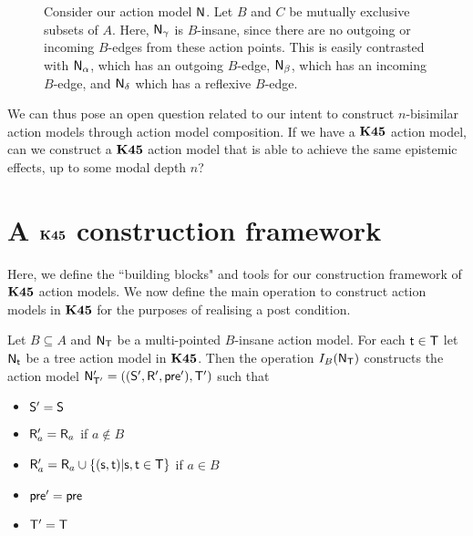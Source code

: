 \begin{figure}
\centering
{}
\caption[$B$-insane action models]{Consider our action model $\mathrm{\mathsf{N}}$. Let $B$ and $C$ be mutually exclusive
  subsets of $A$. Here, $\mathrm{\mathsf{N}}_\gamma$
  is $B$-insane, since there are no outgoing or incoming $B$-edges from these
  action points.
This is easily contrasted with $\mathrm{\mathsf{N}}_\alpha$, which has an outgoing $B$-edge, $\mathrm{\mathsf{N}}_\beta$, which
has an incoming $B$-edge, and $\mathrm{\mathsf{N}}_\delta$ which has a reflexive $B$-edge.}
\label{bInsaneExample}
\end{figure}

We can thus pose an open question related to our intent to construct $n$-bisimilar action models
through action model composition.
If we have a $\bf K45$ action model, can we construct a $\bf K45$ action model that is able to achieve
the same epistemic effects, up to some modal depth $n$?

\section{A $\bf K45$ construction framework} \label{subsec:k45:techPrelims}

Here, we define the ``building blocks" and tools for our construction framework of $\bf K45$ action models.
We now define the main operation to construct action models in $\bf K45$ for the
purposes of realising a post condition.

\begin{defn} \label{makeEquivalence}
	Let $B \subseteq A$ and $\mathrm{\mathsf{N}}_\mathrm{\mathsf{T}}$ be a multi-pointed $B$-insane action model.
  For each $\mathrm{\mathsf{t}} \in \mathrm{\mathsf{T}}$ let $\mathrm{\mathsf{N}}_\mathrm{\mathsf{t}}$ be a tree action model in $\bf K45$.
  Then the operation $I_B(\mathrm{\mathsf{N}}_\mathrm{\mathsf{T}})$ constructs the action model $\mathrm{\mathsf{N}}'_{\mathrm{\mathsf{T}}'} =
  ((\mathrm{\mathsf{S}}',\mathrm{\mathsf{R}}',\mathrm{\mathsf{pre}}'),\mathrm{\mathsf{T}}')$ such that
  \begin{itemize}
    \item $\mathrm{\mathsf{S}}' = \mathrm{\mathsf{S}}$
    \item $\mathrm{\mathsf{R}}'_a = \mathrm{\mathsf{R}}_a$ if $a \notin B$
    \item $\mathrm{\mathsf{R}}'_a = \mathrm{\mathsf{R}}_a \cup \{(\mathrm{\mathsf{s}}, \mathrm{\mathsf{t}}) | \mathrm{\mathsf{s}}, \mathrm{\mathsf{t}} \in \mathrm{\mathsf{T}}\}$ if $a
    \in B$
    \item $\mathrm{\mathsf{pre}}' = \mathrm{\mathsf{pre}}$
    \item $\mathrm{\mathsf{T}}' = \mathrm{\mathsf{T}}$
  \end{itemize}
\end{defn}

